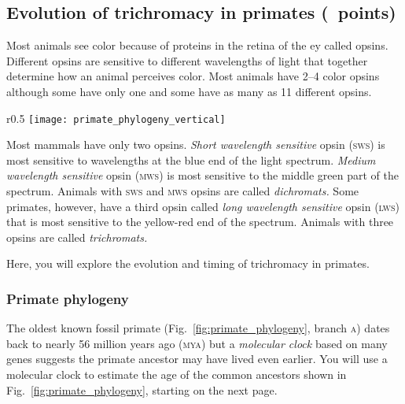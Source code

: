 \documentclass[12pt, addpoints]{exam}
\newcommand{\sws}{\textsc{sws}}
\newcommand{\mws}{\textsc{mws}}
\newcommand{\lws}{\textsc{lws}}
\begin{document}
\subsection*{Evolution of trichromacy in primates (\numpoints~points)}

Most animals see color because of proteins in the retina of the ey called opsins. Different opsins are sensitive to different wavelengths of light that together determine how an animal perceives color. Most animals have 2–4 color opsins although some have only one and some have as many as 11 different opsins.

\begin{wrapfigure}[23]{r}{0.5\linewidth}
\vspace{-2\baselineskip}
\centering\texttt{[image: primate\_phylogeny\_vertical]}\par
\caption{Phylogeny of the primates. Letters indicate clade ancestors listed in Table~\ref{tab:divergence}.}\label{fig:primate_phylogeny}
\end{wrapfigure}\par

Most mammals have only two opsins. \textit{Short wavelength sensitive} opsin (\sws{}) is most sensitive to wavelengths at the blue end of the light spectrum. \textit{Medium wavelength sensitive} opsin (\mws{}) is most sensitive to the middle green part of the spectrum. Animals with \sws{} and \mws{} opsins are called \textit{dichromats.} Some primates, however, have a third opsin called \textit{long wavelength sensitive} opsin (\lws{}) that is most sensitive to the yellow-red end of the spectrum. Animals with three opsins are called \textit{trichromats.}

Here, you will explore the evolution and timing of trichromacy in primates.

\subsubsection*{Primate phylogeny}

The oldest known fossil primate (Fig.~\ref{fig:primate_phylogeny}, branch \textsc{a}) dates back to nearly 56 million years ago (\textsc{mya}) but a \emph{molecular clock} based on many genes suggests the primate  ancestor may have lived even earlier. You will use a molecular clock to estimate the age of the common ancestors shown in Fig.~\ref{fig:primate_phylogeny}, starting on the next page.

\end{document}
